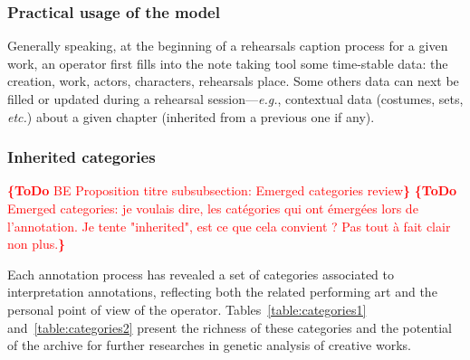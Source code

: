 \documentclass[conference]{IEEEtran}
\newcommand{\todo}[1]{\noindent\textcolor{red}{{\bf \{ToDo} #1{\bf \}}}}
\begin{document}
\subsubsection{Practical usage of the model} Generally speaking, at the beginning of a rehearsals caption process for a given work, an operator first fills into the note taking tool some time-stable data: the creation, work, actors, characters, rehearsals place. Some others data can next be filled or updated during a rehearsal session---\emph{e.g.}, contextual data (costumes, sets, \emph{etc.}) about a given chapter (inherited from a previous one if any).

\subsubsection{Inherited categories}
\todo{BE Proposition titre subsubsection: Emerged categories review}
\todo{Emerged categories: je voulais dire, les catégories qui ont émergées lors de l'annotation. Je tente "inherited", est ce que cela convient ? Pas tout à fait clair non plus.}

Each annotation process has revealed a set of categories associated to interpretation annotations, reflecting both the related performing art and the personal point of view of the operator. Tables~\ref{table:categories1} and~\ref{table:categories2} present the richness of these categories and the potential of the archive for further researches in genetic analysis of creative works.
\end{document}
